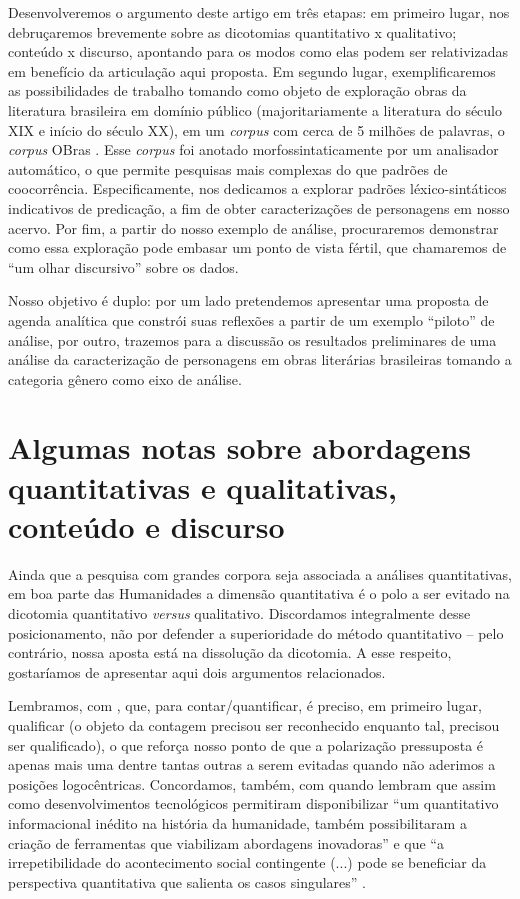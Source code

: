 \documentclass[portuguese]{textolivre}
\begin{document}
Desenvolveremos o argumento deste artigo em três etapas: em primeiro lugar, nos debruçaremos brevemente sobre as dicotomias quantitativo x qualitativo; conteúdo x discurso, apontando para os modos como elas podem ser relativizadas em benefício da articulação aqui proposta. Em segundo lugar, exemplificaremos as possibilidades de trabalho tomando como objeto de exploração obras da literatura brasileira em domínio público (majoritariamente a literatura do século XIX e início do século XX), em um \textit{corpus} com cerca de 5 milhões de palavras, o \textit{corpus} OBras \cite{santos2018}. Esse \textit{corpus} foi anotado morfossintaticamente por um analisador automático, o que permite pesquisas mais complexas do que padrões de coocorrência. Especificamente, nos dedicamos a explorar padrões léxico-sintáticos indicativos de predicação, a fim de obter caracterizações de personagens em nosso acervo. Por fim, a partir do nosso exemplo de análise, procuraremos demonstrar como essa exploração pode embasar um ponto de vista fértil, que chamaremos de “um olhar discursivo” sobre os dados.

Nosso objetivo é duplo: por um lado pretendemos apresentar uma proposta de agenda analítica que constrói suas reflexões a partir de um exemplo “piloto” de análise, por outro, trazemos para a discussão os resultados preliminares de uma análise da caracterização de personagens em obras literárias brasileiras tomando a categoria gênero como eixo de análise.

\section{Algumas notas sobre abordagens quantitativas e qualitativas, conteúdo e discurso}\label{sec-2}
Ainda que a pesquisa com grandes corpora seja associada a análises quantitativas, em boa parte das Humanidades a dimensão quantitativa é o polo a ser evitado na dicotomia quantitativo \textit{versus} qualitativo. Discordamos integralmente desse posicionamento, não por defender a superioridade do método quantitativo – pelo contrário, nossa aposta está na dissolução da dicotomia. A esse respeito, gostaríamos de apresentar aqui dois argumentos relacionados.

Lembramos, com \textcite{santos2014}, que, para contar/quantificar, é preciso, em primeiro lugar, qualificar (o objeto da contagem precisou ser reconhecido enquanto tal, precisou ser qualificado), o que reforça nosso ponto de que a polarização pressuposta é apenas mais uma dentre tantas outras a serem evitadas quando não aderimos a posições logocêntricas. Concordamos, também, com \textcite{leite2015} quando lembram que assim como desenvolvimentos tecnológicos permitiram disponibilizar “um quantitativo informacional inédito na história da humanidade, também possibilitaram a criação de ferramentas que viabilizam abordagens inovadoras” e que “a irrepetibilidade do acontecimento social contingente (...) pode se beneficiar da perspectiva quantitativa que salienta os casos singulares” \cite[p.~141]{leite2015}.
\end{document}
